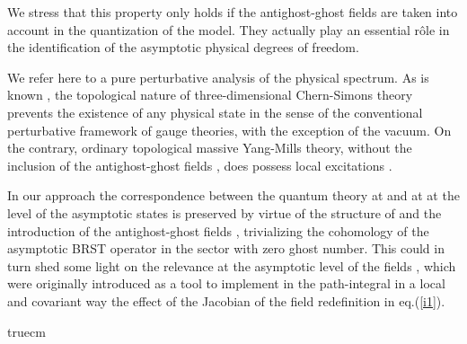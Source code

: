 \documentclass[a4paper,11pt]{article}
\begin{document}
We stress that this property only holds if the antighost-ghost fields
\coordHE{} are taken into account in the quantization
of the model. They actually play an essential r\^ole in the identification
of the asymptotic physical degrees of freedom.

We refer here to a pure perturbative
analysis of the physical spectrum. As is known \cite{Guadagnini:1989kr}, 
the topological
nature of three-dimensional Chern-Simons theory prevents 
the existence
of any physical state in the sense of the conventional perturbative framework of gauge theories, with the exception of the vacuum.
%
On the contrary, ordinary topological massive Yang-Mills theory, without
the inclusion of the antighost-ghost fields \coordHE{},
does possess local excitations \cite{top_mass}.

In our approach 
the correspondence between the quantum theory at \coordHE{} and
at \coordHE{} at the level of the asymptotic states is
preserved by virtue of the structure of \coordHE{} and 
 the introduction of the antighost-ghost fields \coordHE{},
trivializing the cohomology of the asymptotic BRST operator \coordHE{}
in the sector with zero ghost number.
%
This could in turn shed some light on the relevance at the 
asymptotic level
of the 
fields \coordHE{}, which were 
originally introduced \cite{ET}
 as a tool to implement  in the path-integral
in a local and covariant way
the effect 
of the Jacobian of the field redefinition in eq.(\ref{i1}).


 truecm
\end{document}
